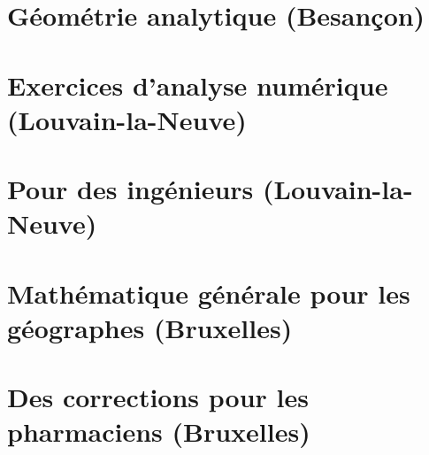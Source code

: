 
\chapter{Géométrie analytique (Besançon)}


\chapter{Exercices d'analyse numérique (Louvain-la-Neuve)}



\chapter{Pour des ingénieurs (Louvain-la-Neuve)}



\chapter{Mathématique générale pour les géographes (Bruxelles)}


\chapter{Des corrections pour les pharmaciens (Bruxelles)}




%
